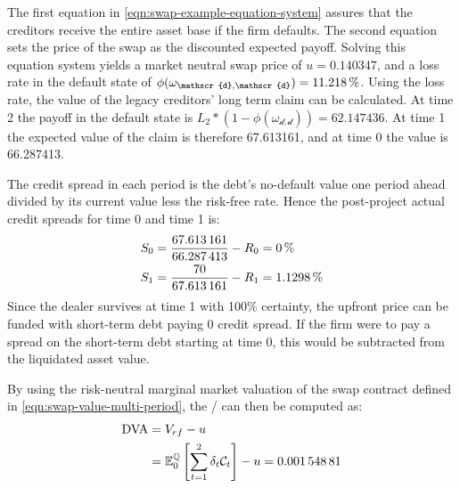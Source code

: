 \documentclass[main.tex]{subfiles}
\begin{document}
            The first equation in \cref{eqn:swap-example-equation-system} assures that the creditors receive the entire asset base if the firm defaults.
            The second equation sets the price of the swap as the discounted expected payoff.
            Solving this equation system yields a market neutral swap price of $u=\num{0.140347}$,
            and a loss rate in the default state of 
            $\phi(\omega_{\mathscr{d},\mathscr{d}})=\pct{0.11218}$.
            Using the loss rate, the value of the legacy creditors' long term claim can be calculated.
            At time 2 the payoff in the default state is 
            $L_{2}*(1-\phi(\omega_{\mathscr{d},\mathscr{d}})) = \num{62.147436}$.
            At time 1 the expected value of the claim is therefore \num{67.613161},
            and at time 0 the value is \num{66.287413}.

            The credit spread in each period is the debt's no-default value one period ahead
            divided by its current value less the risk-free rate.
            Hence the post-project actual credit spreads for time 0 and time 1 is:
            \begin{align}
                S_{0} 
                &=
                \frac{
                    \num{67.613161}
                }{
                    \num{66.287413}
                }
                -
                R_{0}
                =
                \pct{0}
                \\
                S_{1} 
                &= 
                \frac{
                    \num{70}
                }{
                    \num{67.613161}
                } 
                -
                R_{1}
                =
                \pct{0.011298}
            \end{align}
            Since the dealer survives at time 1 with 100\% certainty,
            the upfront price can be funded with short-term debt paying 0 credit spread.
            If the firm were to pay a spread on the short-term debt starting at time 0,
            this would be subtracted from the liquidated asset value. 

            By using the risk-neutral marginal market valuation of the swap contract
            defined in \cref{eqn:swap-value-multi-period},
            the \DVA/ can then be computed as:
            \begin{align}
                \DVA/ &= V_{rf} - u
                \nonumber
                \\
                &= \mathbb{E}_{0}^{\rnmeasure}\left[\sum_{t=1}^{2}\delta_t \mathcal{C}_t\right] - u
                = \num{0.00154881}
            \end{align}
\end{document}
